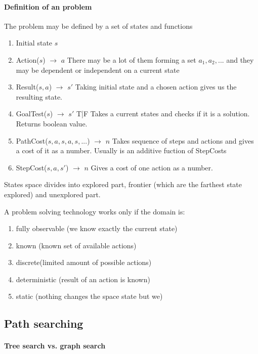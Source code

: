 \documentclass[a4paper,10pt]{article}
\begin{document}
\paragraph{Definition of an problem}
The problem may be defined by a set of states and functions
\begin{enumerate}
  \item Initial state $s$
  \item Action($s$) $\rightarrow$ $a$ There may be a lot of them forming a set ${a_1, a_2, ...}$ and they may be dependent or independent on a current state
  \item Result($s,a$) $\rightarrow$ $s'$ Taking initial state and a chosen action gives us the resulting state.
  \item GoalTest($s$) $\rightarrow$ $s'$ T|F Takes a current states and checks if it is a solution. Returns boolean value.
  \item PathCost($s,a,s,a,s,...$) $\rightarrow$ $n$ Takes sequence of steps and actions and gives a cost of it as a number. Usually is an additive fuction of StepCosts
  \item StepCost($s,a,s'$) $\rightarrow$ $n$ Gives a cost of one action as a number.
\end{enumerate}

States space divides into explored part, frontier (which are the farthest state explored) and unexplored part.

A problem solving technology works only if the domain is:
\begin{enumerate}
 \item fully observable (we know exactly the current state)
 \item known (known set of available actions)
 \item discrete(limited amount of possible actions)
 \item deterministic (result of an action is known)
 \item static (nothing changes the space state but we)
\end{enumerate}

\subsection{Path searching}

\paragraph{Tree search vs. graph search} 
\end{document}
